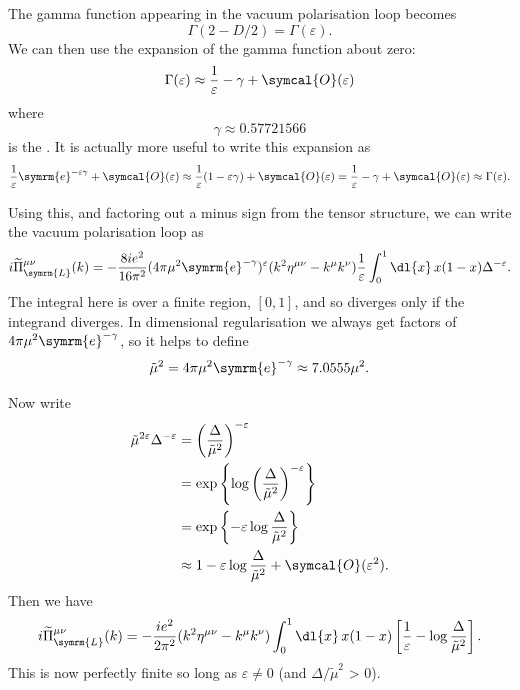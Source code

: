 \documentclass[fleqn]{NotesClass}
\newcommand{\e}{\symrm{e}}
\newcommand{\order}{\symcal{O}}
\newcommand{\minkowskiMetric}{\eta}
\begin{document}
    The gamma function appearing in the vacuum polarisation loop becomes
    \begin{equation}
        \Gamma(2 - D/2) = \Gamma(\varepsilon).
    \end{equation}
    We can then use the expansion of the gamma function about zero:
    \begin{equation}
        \Gamma(\varepsilon) \approx \frac{1}{\varepsilon} - \gamma + \order(\varepsilon)
    \end{equation}
    where
    \begin{equation}
        \gamma \approx 0.57721566
    \end{equation}
    is the .
    It is actually more useful to write this expansion as
    \begin{equation}
        \frac{1}{\varepsilon}\e^{-\varepsilon \gamma} + \order(\varepsilon) \approx \frac{1}{\varepsilon}(1 - \varepsilon\gamma) + \order(\varepsilon) = \frac{1}{\varepsilon} - \gamma + \order(\varepsilon) \approx \Gamma(\varepsilon).
    \end{equation}
    
    Using this, and factoring out a minus sign from the tensor structure, we can write the vacuum polarisation loop as
    \begin{equation}
        i\widetilde{\Pi}_{\symrm{L}}^{\mu\nu}(k) = -\frac{8ie^2}{16\pi^2}(4\pi \mu^2 \e^{-\gamma})^{\varepsilon}(k^2 \minkowskiMetric^{\mu\nu} - k^\mu k^\nu) \frac{1}{\varepsilon} \int_0^1 \dl{x} \, x(1 - x) \Delta^{-\varepsilon}.
    \end{equation}
    The integral here is over a finite region, \([0, 1]\), and so diverges only if the integrand diverges.
    In dimensional regularisation we always get factors of \(4\pi \mu^2\e^{-\gamma}\), so it helps to define
    \begin{equation}
        \tilde{\mu}^2 = 4\pi\mu^2\e^{-\gamma} \approx 7.0555 \mu^2.
    \end{equation}
    
    Now write
    \begin{align}
        \tilde{\mu}^{2\varepsilon} \Delta^{-\varepsilon} &= \left( \frac{\Delta}{\tilde{\mu}^2} \right)^{-\varepsilon}\\
        &= \exp\left\{ \log \left( \frac{\Delta}{\tilde{\mu}^2} \right)^{-\varepsilon} \right\}\\
        &= \exp\left\{ -\varepsilon\log \frac{\Delta}{\tilde{\mu}^2} \right\}\\
        &\approx 1 - \varepsilon \log \frac{\Delta}{\tilde{\mu}^2} + \order(\varepsilon^2).
    \end{align}
    Then we have
    \begin{equation}
        i\widetilde{\Pi}_{\symrm{L}}^{\mu\nu}(k) = -\frac{ie^2}{2\pi^2} (k^2 \minkowskiMetric^{\mu\nu} - k^\mu k^\nu) \int_0^1 \dl{x} \, x(1 - x) \left[ \frac{1}{\varepsilon} - \log \frac{\Delta}{\tilde{\mu}^2} \right].
    \end{equation}
    This is now perfectly finite so long as \(\varepsilon \ne 0\) (and \(\Delta/\tilde{\mu}^2\) > 0).
    
\end{document}
